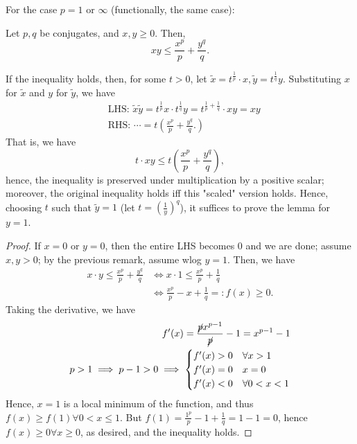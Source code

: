 \begin{example}
    For the case $p = 1$ or $\infty$ (functionally, the same case): %
\end{example}

\begin{lemma}\label{lemma:holderslemmainequality}
    Let $p, q$ be conjugates, and $x, y \geq 0$. Then, \[
    xy \leq \frac{x^p}{p}+\frac{y^q}{q}.    
    \]
\end{lemma}

\begin{remark}
    If the inequality holds, then, for some $t > 0$, let $\tilde{x} = t^{\frac{1}{p}} \cdot x, \tilde{y} = t^{\frac{1}{q}}y$. Substituting $x$ for $\tilde{x}$ and $y$ for $\tilde y$, we have \begin{align*}
    &\text{LHS: } \tilde{x}\tilde{y} = t^{\frac{1}{p}}x\cdot t^{\frac{1}{q}}y    = t^{\frac{1}{p}+\frac{1}{q}}\cdot xy = xy\\
    &\text{RHS: } \cdots = t (\frac{x^p}{p} + \frac{y^q}{q}.)
    \end{align*}
    That is, we have \[
    t\cdot xy \leq t \left(\frac{x^p}{p} + \frac{y^q}{q}\right),
    \]
    hence, the inequality is preserved under multiplication by a positive scalar; moreover, the original inequality holds iff this "scaled" version holds. Hence, choosing $t$ such that $\tilde{y} = 1$ (let $t = \left(\frac{1}{y}\right)^q$), it suffices to prove the lemma for $y = 1$.
\end{remark}

\begin{proof}
    If $x = 0$ or $y = 0$, then the entire LHS becomes $0$ and we are done; assume $x, y > 0$; by the previous remark, assume wlog $y =1$. Then, we have \begin{align*}
        x \cdot y \leq \frac{x^p}{p} + \frac{y^q}{q} &\iff x \cdot 1 \leq \frac{x^p}{p} + \frac{1}{q}\\
         &\iff \frac{x^p}{p} - x + \frac{1}{q} =: f(x) \geq 0.
    \end{align*}
    Taking the derivative, we have \begin{align*}
        f'(x) = \frac{\cancel{p}x^{p-1}}{\cancel{p}} - 1 = x^{p-1} - 1\\
        p > 1 \implies p - 1 > 0 \implies \begin{cases}
             f'(x) > 0 & \forall x > 1\\
             f'(x) = 0 & x = 0\\
             f'(x) <0 & \forall 0 < x < 1
        \end{cases}
    \end{align*}
    Hence, $x = 1$ is a local minimum of the function, and thus $f(x) \geq f(1) \forall 0 < x \leq 1$. But $f(1) = \frac{1^p}{p} - 1 + \frac{1}{q} = 1 - 1 = 0$, hence $f(x) \geq 0 \forall x \geq 0$, as desired, and the inequality holds.
\end{proof}

